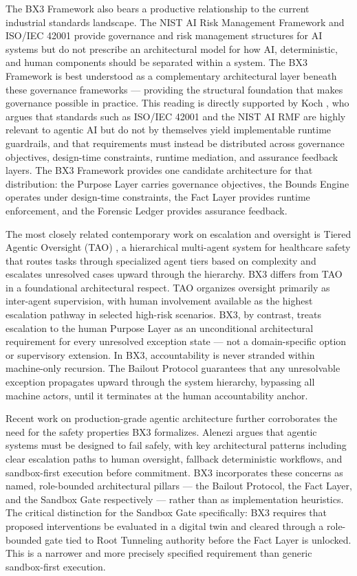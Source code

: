 \documentclass[12pt]{article}
\begin{document}
The BX3 Framework also bears a productive relationship to the current industrial standards landscape. The NIST AI Risk Management Framework \cite{nist2023} and ISO/IEC 42001 \cite{iso42001} provide governance and risk management structures for AI systems but do not prescribe an architectural model for how AI, deterministic, and human components should be separated within a system. The BX3 Framework is best understood as a complementary architectural layer beneath these governance frameworks --- providing the structural foundation that makes governance possible in practice. This reading is directly supported by Koch \cite{koch2026}, who argues that standards such as ISO/IEC 42001 and the NIST AI RMF are highly relevant to agentic AI but do not by themselves yield implementable runtime guardrails, and that requirements must instead be distributed across governance objectives, design-time constraints, runtime mediation, and assurance feedback layers. The BX3 Framework provides one candidate architecture for that distribution: the Purpose Layer carries governance objectives, the Bounds Engine operates under design-time constraints, the Fact Layer provides runtime enforcement, and the Forensic Ledger provides assurance feedback.

The most closely related contemporary work on escalation and oversight is Tiered Agentic Oversight (TAO) \cite{kim2025tao}, a hierarchical multi-agent system for healthcare safety that routes tasks through specialized agent tiers based on complexity and escalates unresolved cases upward through the hierarchy. BX3 differs from TAO in a foundational architectural respect. TAO organizes oversight primarily as inter-agent supervision, with human involvement available as the highest escalation pathway in selected high-risk scenarios. BX3, by contrast, treats escalation to the human Purpose Layer as an unconditional architectural requirement for every unresolved exception state --- not a domain-specific option or supervisory extension. In BX3, accountability is never stranded within machine-only recursion. The Bailout Protocol guarantees that any unresolvable exception propagates upward through the system hierarchy, bypassing all machine actors, until it terminates at the human accountability anchor.

Recent work on production-grade agentic architecture further corroborates the need for the safety properties BX3 formalizes. Alenezi \cite{alenezi2026} argues that agentic systems must be designed to fail safely, with key architectural patterns including clear escalation paths to human oversight, fallback deterministic workflows, and sandbox-first execution before commitment. BX3 incorporates these concerns as named, role-bounded architectural pillars --- the Bailout Protocol, the Fact Layer, and the Sandbox Gate respectively --- rather than as implementation heuristics. The critical distinction for the Sandbox Gate specifically: BX3 requires that proposed interventions be evaluated in a digital twin and cleared through a role-bounded gate tied to Root Tunneling authority before the Fact Layer is unlocked. This is a narrower and more precisely specified requirement than generic sandbox-first execution.
\end{document}
